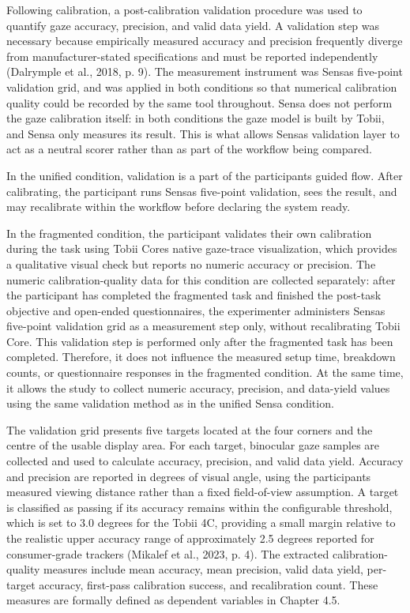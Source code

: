 \documentclass[
]{article}
\begin{document}
Following calibration, a post-calibration validation procedure was used to quantify gaze accuracy, precision, and valid data yield. A validation step was necessary because empirically measured accuracy and precision frequently diverge from manufacturer-stated specifications and must be reported independently (Dalrymple et al., 2018, p. 9). The measurement instrument was Sensa\textquotesingle s five-point validation grid, and was applied in both conditions so that numerical calibration quality could be recorded by the same tool throughout. Sensa does not perform the gaze calibration itself: in both conditions the gaze model is built by Tobii, and Sensa only measures its result. This is what allows Sensa\textquotesingle s validation layer to act as a neutral scorer rather than as part of the workflow being compared.

In the unified condition, validation is a part of the participant\textquotesingle s guided flow. After calibrating, the participant runs Sensa\textquotesingle s five-point validation, sees the result, and may recalibrate within the workflow before declaring the system ready.

In the fragmented condition, the participant validates their own calibration during the task using Tobii Core\textquotesingle s native gaze-trace visualization, which provides a qualitative visual check but reports no numeric accuracy or precision. The numeric calibration-quality data for this condition are collected separately: after the participant has completed the fragmented task and finished the post-task objective and open-ended questionnaires, the experimenter administers Sensa\textquotesingle s five-point validation grid as a measurement step only, without recalibrating Tobii Core. This validation step is performed only after the fragmented task has been completed. Therefore, it does not influence the measured setup time, breakdown counts, or questionnaire responses in the fragmented condition. At the same time, it allows the study to collect numeric accuracy, precision, and data-yield values using the same validation method as in the unified Sensa condition.

The validation grid presents five targets located at the four corners and the centre of the usable display area. For each target, binocular gaze samples are collected and used to calculate accuracy, precision, and valid data yield. Accuracy and precision are reported in degrees of visual angle, using the participant\textquotesingle s measured viewing distance rather than a fixed field-of-view assumption. A target is classified as passing if its accuracy remains within the configurable threshold, which is set to 3.0 degrees for the Tobii 4C, providing a small margin relative to the realistic upper accuracy range of approximately 2.5 degrees reported for consumer-grade trackers (Mikalef et al., 2023, p. 4). The extracted calibration-quality measures include mean accuracy, mean precision, valid data yield, per-target accuracy, first-pass calibration success, and recalibration count. These measures are formally defined as dependent variables in Chapter 4.5.
\end{document}
